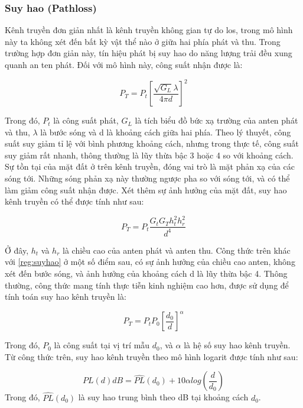 \subsubsection{Suy hao (Pathloss)}

Kênh truyền đơn giản nhất là kênh truyền không gian tự do \ac{los}, trong mô hình này ta không
xét đến bất kỳ vật thể nào ở giữa hai phía phát và thu. Trong trường hợp đơn giản này, tín hiệu phát bị suy hao do
năng lượng trải đều xung quanh an ten phát. Đối với mô hình này, công suất nhận được là:

\begin{equation}
	P_T=P_t[\dfrac{\sqrt{G_L} \lambda}{4 \pi d}]^2
	\label{reg:suyhao}
\end{equation}


Trong đó, $P_t$ là công suất phát, $G_L$ là tích biểu đồ bức xạ trường của anten phát và thu, $\lambda$ là bước sóng và d
là khoảng cách giữa hai phía. Theo lý thuyết, công suất suy giảm tỉ lệ với bình phương khoảng cách, nhưng trong
thực tế, công suất suy giảm rất nhanh, thông thường là lũy thừa bậc 3 hoặc 4 so với khoảng cách. Sự tồn tại của
mặt đất ở trên kênh truyền, đóng vai trò là mặt phản xạ của các sóng tới. Những sóng phản xạ này thường ngược
pha so với sóng tới, và có thể làm giảm công suất nhận được. Xét thêm sự ảnh hưởng của mặt đất, suy hao kênh
truyền có thể được tính như sau:

\begin{equation}
	P_T=P_t \dfrac{G_t G_T h_t^2 h_r^2}{d^4}
\end{equation}

Ở đây, $h_t$ và $h_r$ là chiều cao của anten phát và anten thu. Công thức trên khác với \eqref{reg:suyhao}  ở một số
điểm sau, có sự ảnh hưởng của chiều cao anten, không xét đến bước sóng, và ảnh hưởng của khoảng cách d là lũy
thừa bậc 4. Thông thường, công thức mang tính thực tiễn kinh nghiệm cao hơn, được sử dụng để tính toán suy hao
kênh truyền là:

\begin{equation}
	P_T=P_t P_0 [\dfrac{d_0}{d}]^\alpha
\end{equation}
	
	Trong đó, $P_0$ là công suất tại vị trí mẫu $d_0$, và $\alpha$ là hệ số suy hao kênh truyền. Từ công thức trên, suy hao
	kênh truyền theo mô hình logarit được tính như sau:
	
	\begin{equation}
		PL(d)dB=\hat{PL}(d_0)+10 \alpha log(\dfrac{d}{d_0})
	\end{equation}
Trong đó, $\hat{PL}(d_0)$ là suy hao trung bình theo dB tại khoảng cách $d_0$.

